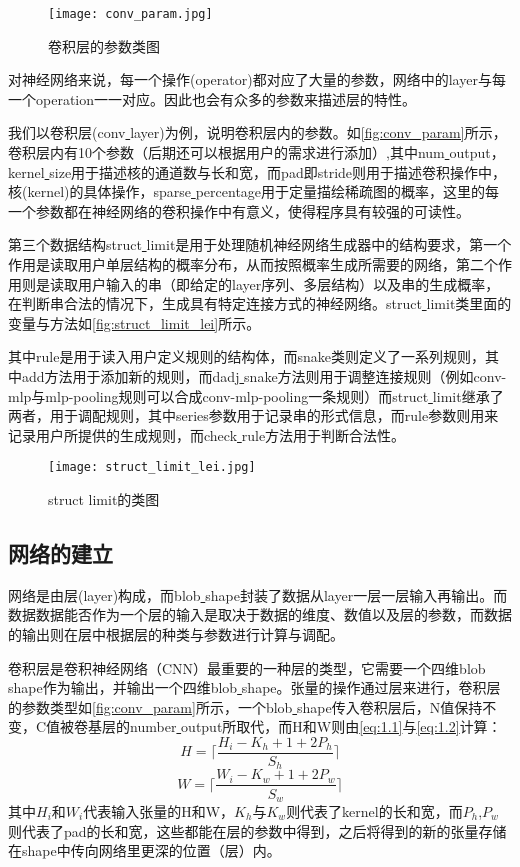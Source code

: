 \begin{figure}[!htbp]
\centering
\texttt{[image: conv\_param.jpg]}
\caption{卷积层的参数类图}
\label{fig:conv_param}
\end{figure}
对神经网络来说，每一个操作(operator)都对应了大量的参数，网络中的layer与每一个operation一一对应。因此也会有众多的参数来描述层的特性。

我们以卷积层(conv\underline{ }layer)为例，说明卷积层内的参数。如\autoref{fig:conv_param}所示，卷积层内有10个参数（后期还可以根据用户的需求进行添加）,其中num\underline{ }output，kernel\underline{ }size用于描述核的通道数与长和宽，而pad即stride则用于描述卷积操作中，核(kernel)的具体操作，sparse\underline{ }percentage用于定量描绘稀疏图的概率，这里的每一个参数都在神经网络的卷积操作中有意义，使得程序具有较强的可读性。

第三个数据结构struct\underline{ }limit是用于处理随机神经网络生成器中的结构要求，第一个作用是读取用户单层结构的概率分布，从而按照概率生成所需要的网络，第二个作用则是读取用户输入的串（即给定的layer序列、多层结构）以及串的生成概率，在判断串合法的情况下，生成具有特定连接方式的神经网络。struct\underline{ }limit类里面的变量与方法如\autoref{fig:struct_limit_lei}所示。

其中rule是用于读入用户定义规则的结构体，而snake类则定义了一系列规则，其中add方法用于添加新的规则，而dadj\underline{ }snake方法则用于调整连接规则（例如conv-mlp与mlp-pooling规则可以合成conv-mlp-pooling一条规则）而struct\underline{ }limit继承了两者，用于调配规则，其中series参数用于记录串的形式信息，而rule参数则用来记录用户所提供的生成规则，而check\underline{ }rule方法用于判断合法性。

\begin{figure}[!htbp]
\centering
\texttt{[image: struct\_limit\_lei.jpg]}
\caption{struct limit的类图}
\label{fig:struct_limit_lei}
\end{figure}

\subsection{网络的建立}
网络是由层(layer)构成，而blob\underline{ }shape封装了数据从layer一层一层输入再输出。而数据数据能否作为一个层的输入是取决于数据的维度、数值以及层的参数，而数据的输出则在层中根据层的种类与参数进行计算与调配。

卷积层是卷积神经网络（CNN）最重要的一种层的类型，它需要一个四维blob\underline{ }shape作为输出，并输出一个四维blob\underline{ }shape。张量的操作通过层来进行，卷积层的参数类型如\autoref{fig:conv_param}所示，一个blob\underline{ }shape传入卷积层后，N值保持不变，C值被卷基层的number\underline{ }output所取代，而H和W则由\autoref{eq:1.1}与\autoref{eq:1.2}计算：
\begin{equation}\label{eq:1.1}
H=\lceil \frac{H_{i}-K_h+1+2P_{h}}{S_{h}}\rceil
\end{equation}
\begin{equation}\label{eq:1.2}
W=\lceil \frac{W_{i}-K_w+1+2P_{w}}{S_{w}}\rceil
\end{equation}
其中$H_{i}$和$W_{i}$代表输入张量的H和W，$K_h$与$K_w$则代表了kernel的长和宽，而$P_h$,$P_w$则代表了pad的长和宽，这些都能在层的参数中得到，之后将得到的新的张量存储在shape中传向网络里更深的位置（层）内。

